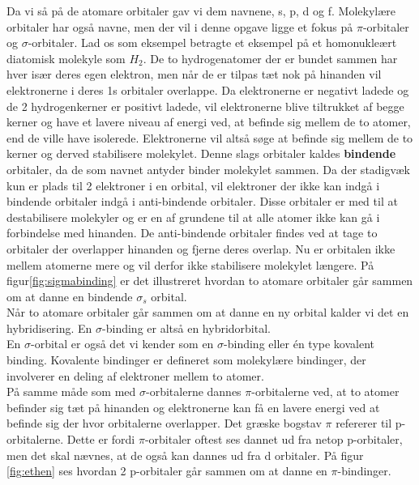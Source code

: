 Da vi så på de atomare orbitaler gav vi dem navnene, s, p, d og f. Molekylære orbitaler har også navne, men der vil i denne opgave ligge et fokus på $\pi$-orbitaler og $\sigma$-orbitaler. Lad os som eksempel betragte et eksempel på et homonukleært diatomisk molekyle som $H_2$. De to hydrogenatomer der er bundet sammen har hver især deres egen elektron, men når de er tilpas tæt nok på hinanden vil elektronerne i deres 1s orbitaler overlappe. Da elektronerne er negativt ladede og de 2 hydrogenkerner er positivt ladede, vil elektronerne blive tiltrukket af begge kerner og have et lavere niveau af energi ved, at befinde sig mellem de to atomer, end de ville have isolerede. Elektronerne vil altså søge at befinde sig mellem de to kerner og derved stabilisere molekylet. Denne slags orbitaler kaldes \textbf{bindende} orbitaler, da de som navnet antyder binder molekylet sammen. Da der stadigvæk kun er plads til 2  elektroner i en orbital, vil elektroner der ikke kan indgå i bindende orbitaler indgå i anti-bindende orbitaler. Disse orbitaler er med til at destabilisere molekyler og er en af grundene til at alle atomer ikke kan gå i forbindelse med hinanden. De anti-bindende orbitaler findes ved at tage to orbitaler der overlapper hinanden og fjerne deres overlap. Nu er orbitalen ikke mellem atomerne mere og vil derfor ikke stabilisere molekylet længere. På figur\ref{fig:sigmabinding} er det illustreret hvordan to atomare orbitaler går sammen om at danne en bindende $\sigma_s$ orbital. 
\\

Når to atomare orbitaler går sammen om at danne en ny orbital kalder vi det en hybridisering. En $\sigma$-binding er altså en hybridorbital.
\\

En $\sigma$-orbital er også det vi kender som en $\sigma$-binding eller én type kovalent binding. Kovalente bindinger er defineret som molekylære bindinger, der involverer en deling af elektroner mellem to atomer.
\\

På samme måde som med $\sigma$-orbitalerne dannes $\pi$-orbitalerne ved, at to atomer befinder sig tæt på hinanden og elektronerne kan få en lavere energi ved at befinde sig der hvor orbitalerne overlapper. Det græske bogstav $\pi$ refererer til p-orbitalerne. Dette er fordi $\pi$-orbitaler oftest ses dannet ud fra netop p-orbitaler, men det skal nævnes, at de også kan dannes ud fra d orbitaler. På figur \ref{fig:ethen} ses hvordan 2 p-orbitaler går sammen om at danne en $\pi$-bindinger. 
	
